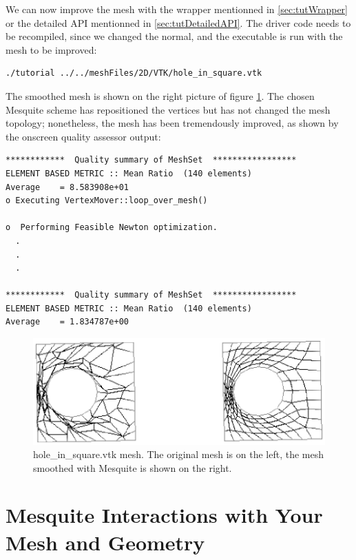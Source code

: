 \documentclass[letter]{report}
\begin{document}
We can now improve the mesh with the wrapper mentionned in \ref{sec:tutWrapper} or the detailed API
mentionned in \ref{sec:tutDetailedAPI}. The driver code needs to be recompiled, since we changed the
normal, and the executable is run with the mesh to be improved:
\begin{verbatim}
./tutorial ../../meshFiles/2D/VTK/hole_in_square.vtk
\end{verbatim}
The smoothed mesh is shown on the right picture of figure
\ref{fig:hole}. The chosen Mesquite scheme has repositioned the vertices but has not changed the
mesh topology; nonetheless, the mesh has been tremendously improved, as shown by the onscreen
quality assessor output: 
\begin{verbatim}
************  Quality summary of MeshSet  *****************
ELEMENT BASED METRIC :: Mean Ratio  (140 elements)
Average    = 8.583908e+01
o Executing VertexMover::loop_over_mesh()

o  Performing Feasible Newton optimization.
  .
  .
  .

************  Quality summary of MeshSet  *****************
ELEMENT BASED METRIC :: Mean Ratio  (140 elements)
Average    = 1.834787e+00
\end{verbatim}
\begin{figure}[htbp]
\begin{center}
    \includegraphics{hole_in_square.ps}
    \caption{hole\_in\_square.vtk mesh. The original mesh is on the left, the mesh smoothed with
    Mesquite is shown on the right.}
    \label{fig:hole}
\end{center}
\end{figure}


\chapter{Mesquite Interactions with Your Mesh and Geometry}
\label{sec:meshes}
\end{document}
